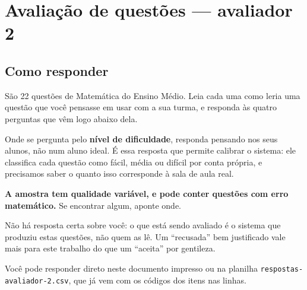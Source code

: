\documentclass[11pt,a4paper]{article}
\begin{document}
\section*{Avaliação de questões --- avaliador 2}
\subsection*{Como responder}

São 22 questões de Matemática do Ensino Médio. Leia cada uma como leria uma
questão que você pensasse em usar com a sua turma, e responda às quatro
perguntas que vêm logo abaixo dela.

Onde se pergunta pelo \textbf{nível de dificuldade}, responda pensando nos
seus alunos, não num aluno ideal. É essa resposta que permite calibrar o
sistema: ele classifica cada questão como fácil, média ou difícil por conta
própria, e precisamos saber o quanto isso corresponde à sala de aula real.

\textbf{A amostra tem qualidade variável, e pode conter questões com erro
matemático.} Se encontrar algum, aponte onde.

Não há resposta certa sobre você: o que está sendo avaliado é o sistema que
produziu estas questões, não quem as lê. Um ``recusada'' bem justificado vale
mais para este trabalho do que um ``aceita'' por gentileza.

Você pode responder direto neste documento impresso ou na planilha
\texttt{respostas-avaliador-2.csv}, que já vem com os códigos dos itens nas linhas.
\end{document}
